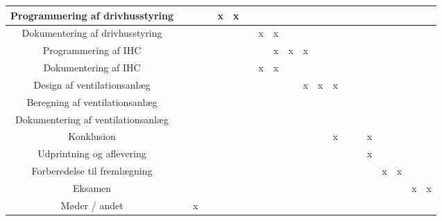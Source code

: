 \documentclass[12pt,a4paper,twoside,landscape]{article}
\begin{document}
\begin{tabular}[c]{|c||l|l|l|l|l|l|l||l|l|l|l|l|l|l||l|l|l|l|l|}
            Programmering af drivhusstyring     & & & & x & x & & & & & & & & & & & & & & \\ \hline
            Dokumentering af drivhusstyring     & & & & & & & x & x & & & & & & & & & & & \\ \hline
            Programmering af IHC                & & & & & & & & x & x & x & & & & & & & & & \\ \hline
            Dokumentering af IHC                & & & & & & & x & x &   & & & & & & & & & & \\ \hline
            Design af ventilationsanlæg         & & & & & & & & & & x & x & x & & & & & & & \\ \hline
            Beregning af ventilationsanlæg      & & & & & & & & & & & & & & & & & & & \\ \hline
            Dokumentering af ventilationsanlæg  & & & & & & & & & & & & & & & & & & & \\ \hline
            Konklusion                          & & & & & & & & & & & & x & & & x & & & & \\ \hline
            Udprintning og aflevering           & & & & & & & & & & & & & & & x & & & & \\ \hline
            Forberedelse til fremlægning        & & & & & & & & & & & & & & & & x & x & & \\ \hline
            Eksamen                             & & & & & & & & & & & & & & & & & & x & x \\ \hline
            Møder / andet                       & & x & & & & & & & & & & & & & & & & & \\ \hline



\end{tabular}
\end{document}
